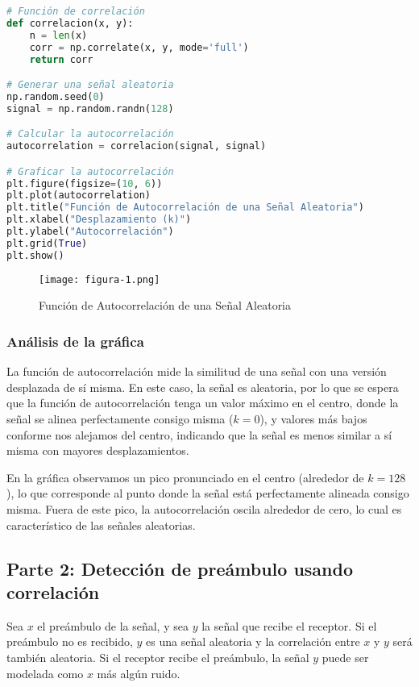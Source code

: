 \documentclass[letterpaper,12pt,oneside]{article}
\begin{document}
\begin{tcolorbox}[colback=black!5!white,colframe=black!80!white,title=Código Python: Implementación de la función de correlación, fonttitle=\bfseries]
\begin{lstlisting}[language=Python, basicstyle=\ttfamily\footnotesize, breaklines=true]
# Función de correlación
def correlacion(x, y):
    n = len(x)
    corr = np.correlate(x, y, mode='full')
    return corr

# Generar una señal aleatoria
np.random.seed(0)
signal = np.random.randn(128)

# Calcular la autocorrelación
autocorrelation = correlacion(signal, signal)

# Graficar la autocorrelación
plt.figure(figsize=(10, 6))
plt.plot(autocorrelation)
plt.title("Función de Autocorrelación de una Señal Aleatoria")
plt.xlabel("Desplazamiento (k)")
plt.ylabel("Autocorrelación")
plt.grid(True)
plt.show()
\end{lstlisting}
\end{tcolorbox}

\begin{figure}[H]
    \centering
    \texttt{[image: figura-1.png]}
    \caption{Función de Autocorrelación de una Señal Aleatoria}
    \label{fig:autocorrelacion}
\end{figure}

\subsubsection*{Análisis de la gráfica}
La función de autocorrelación mide la similitud de una señal con una versión desplazada de sí misma. En este caso, la señal es aleatoria, por lo que se espera que la función de autocorrelación tenga un valor máximo en el centro, donde la señal se alinea perfectamente consigo misma (\(k=0\)), y valores más bajos conforme nos alejamos del centro, indicando que la señal es menos similar a sí misma con mayores desplazamientos.

En la gráfica observamos un pico pronunciado en el centro (alrededor de \(k=128\)), lo que corresponde al punto donde la señal está perfectamente alineada consigo misma. Fuera de este pico, la autocorrelación oscila alrededor de cero, lo cual es característico de las señales aleatorias.

\subsection{Parte 2: Detección de preámbulo usando correlación}
Sea \(x\) el preámbulo de la señal, y sea \(y\) la señal que recibe el receptor. Si el preámbulo no es recibido, \(y\) es una señal aleatoria y la correlación entre \(x\) y \(y\) será también aleatoria. Si el receptor recibe el preámbulo, la señal \(y\) puede ser modelada como \(x\) más algún ruido.
\end{document}
